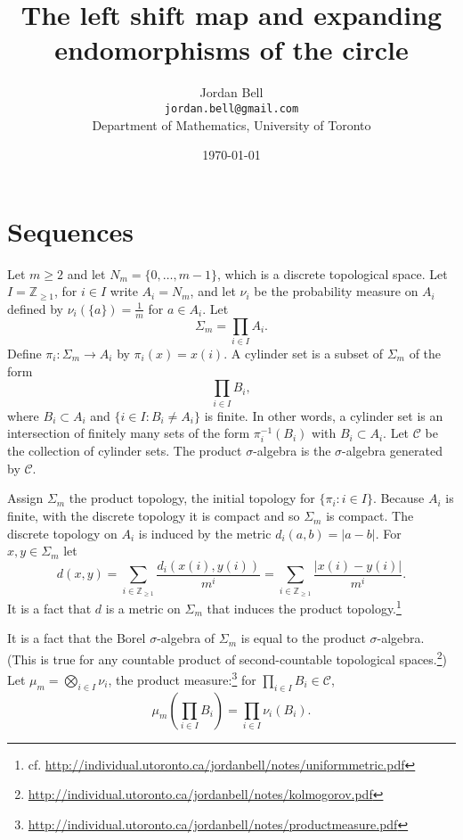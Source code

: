 \documentclass{article}
\theoremstyle{definition}
\begin{document}
\title{The left shift map and expanding endomorphisms of the circle}
\author{Jordan Bell\\ \texttt{jordan.bell@gmail.com}\\Department of Mathematics, University of Toronto}
\date{\today}

\maketitle


\section{Sequences}
Let $m \geq 2$ and
let $N_m = \{0,\ldots,m-1\}$, which is a discrete topological space. Let
$I = \mathbb{Z}_{\geq 1}$,
 for $i \in I$ write $A_i = N_m$, and let 
$\nu_i$ be the probability measure on $A_i$ defined by $\nu_i (\{a\})=\frac{1}{m}$ for $a \in A_i$. 
Let
\[
\Sigma_m = \prod_{i \in I} A_i.
\]
Define $\pi_i:\Sigma_m \to A_i$ by $\pi_i(x) = x(i)$. A cylinder set is a subset of $\Sigma_m$ of the form
\[
\prod_{i \in  I} B_i,
\]
where $B_i \subset A_i$ and $\{i \in I: B_i \neq A_i\}$ is finite. 
In other words, a cylinder set is an intersection of finitely many sets of the form $\pi_i^{-1}(B_i)$ with
$B_i \subset A_i$. Let $\mathscr{C}$ be the collection of cylinder sets. The product $\sigma$-algebra
is the $\sigma$-algebra generated by $\mathscr{C}$. 

Assign $\Sigma_m$ the product topology, the initial
topology for $\{\pi_i: i \in I\}$. Because $A_i$ is finite, with the discrete topology it is compact and so
$\Sigma_m$ is compact. 
The discrete topology on $A_i$ is induced by the metric $d_i(a,b) = |a-b|$. For $x,y \in \Sigma_m$ let
\[
d(x,y) = \sum_{i \in \mathbb{Z}_{\geq 1}} \frac{d_i(x(i),y(i))}{m^i} = \sum_{i \in \mathbb{Z}_{\geq 1}} \frac{|x(i)-y(i)|}{m^i}.
\]
It is a fact that $d$ is a metric on $\Sigma_m$ that induces the product topology.\footnote{cf. \url{http://individual.utoronto.ca/jordanbell/notes/uniformmetric.pdf}}


It is a fact that the Borel $\sigma$-algebra of $\Sigma_m$ is 
equal to the product $\sigma$-algebra. (This is true for any countable product of second-countable topological
spaces.\footnote{\url{http://individual.utoronto.ca/jordanbell/notes/kolmogorov.pdf}})
Let $\mu_m = \bigotimes_{i \in I} \nu_i$, the product measure:\footnote{\url{http://individual.utoronto.ca/jordanbell/notes/productmeasure.pdf}}
for
$\prod_{i \in I} B_i \in \mathscr{C}$,
\[
\mu_m \left(\prod_{i \in I} B_i\right) = \prod_{i \in I} \nu_i(B_i).
\]
\end{document}
